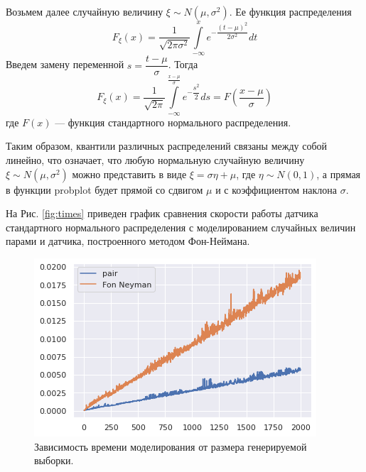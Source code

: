  Возьмем далее случайную величину  \( \xi\sim N(\mu,\sigma^2) \). Ее функция
 распределения
$$
	F_{\xi}(x) = \dfrac{1}{\sqrt{2\pi\sigma^2}} \int\limits_{-\infty}^x
     e^{-\dfrac{(t - \mu)^2}{2 \sigma^2}} dt
$$
Введем замену переменной $ s = \dfrac{t - \mu}{\sigma} $. Тогда
$$
	F_{\xi}(x) = \dfrac{1}{\sqrt{2\pi}} \int\limits_{-\infty}^{\frac{x - \mu}
     {\sigma}} e^{-\dfrac{s^2}{2}} ds = F \left( \dfrac{x - \mu}{\sigma} \right) 
$$
где \( F(x) \) --- функция стандартного нормального распределения.

Таким образом, квантили различных распределений связаны между собой линейно, что
 означает, что любую нормальную случайную величину \( \xi \sim N(\mu, \sigma^2) \)
 можно представить в виде \( \xi = \sigma \eta + \mu \), где \( \eta \sim N(0,1) \),
 а прямая в функции probplot будет прямой со сдвигом \( \mu \) и с коэффициентом
 наклона \( \sigma \).

На Рис. \eqref{fig:times} приведен график сравнения скорости работы датчика
 стандартного нормального распределения с моделированием случайных величин парами
 и датчика, построенного методом Фон-Неймана.

 \begin{figure}[ht]
	\centering
	\includegraphics[width = 0.8\linewidth]{"./resources/times.png"}
	\caption{Зависимость времени моделирования от размера генерируемой выборки.}
    \label{fig:times}
\end{figure}